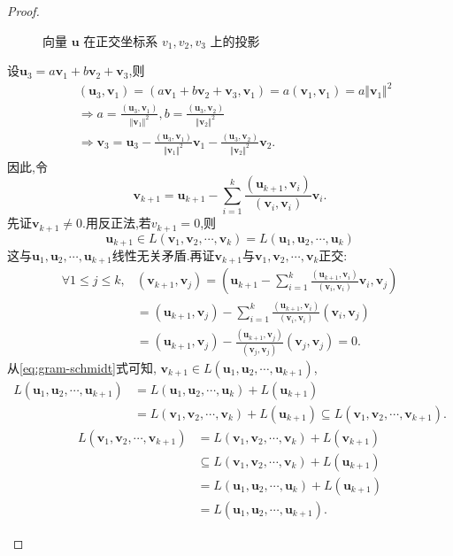 \begin{proof}
\begin{asparaenum}[(1)]
\begin{figure}[htbp]
      \caption{向量 $\mathbf{u}$ 在正交坐标系 $v_1,v_2,v_3$ 上的投影}
      \label{fig:projection}
    \end{figure}
    设$\bm{u}_3=a\bm{v}_1+b\bm{v}_2+\bm{v}_3$,则
    \begin{align*}
    & (\bm{u}_3,\bm{v}_1)=(a\bm{v}_1+b\bm{v}_2+\bm{v}_3,\bm{v}_1)=a(\bm{v}_1,\bm{v}_1)
    =a\Vert\bm{v}_1\Vert^2\\
    & \Longrightarrow a=\frac{(\bm{u}_3,\bm{v}_1)}{\Vert\bm{v}_1\Vert^2},
    b=\frac{(\bm{u}_3,\bm{v}_2)}{\Vert\bm{v}_2\Vert^2}\\
    & \Longrightarrow \bm{v}_3=\bm{u}_3-\frac{(\bm{u}_3,\bm{v}_1)}{\Vert\bm{v}_1\Vert^2}\bm{v}_1
    -\frac{(\bm{u}_3,\bm{v}_2)}{\Vert\bm{v}_2\Vert^2}\bm{v}_2.
    \end{align*}
    因此,令
    \begin{equation}\label{eq:gram-schmidt}
    \boxed{\bm{v}_{k+1} = \bm{u}_{k+1}-\sum_{i=1}^k\frac{(\bm{u}_{k+1},\bm{v}_i)}{(\bm{v}_i,\bm{v}_i)}\bm{v}_i.}
    \end{equation}
    先证$\bm{v}_{k+1}\neq 0$.用反正法,若$v_{k+1}=0$,则
    \[ \bm{u}_{k+1} \in L(\bm{v}_1,\bm{v}_2,\cdots,\bm{v}_k) = L(\bm{u}_1,\bm{u}_2,\cdots,\bm{u}_k)\]
    这与$\bm{u}_1,\bm{u}_2,\cdots,\bm{u}_{k+1}$线性无关矛盾.再证$\bm{v}_{k+1}$与$\bm{v}_1,\bm{v}_2,\cdots,\bm{v}_k$正交:
    \begin{align*}
      \forall 1 \leq j \leq k, & (\bm{v}_{k+1},\bm{v}_j) = (\bm{u}_{k+1}-\sum_{i=1}^k\frac{(\bm{u}_{k+1},\bm{v}_i)}{(\bm{v}_i,\bm{v}_i)}\bm{v}_i,\bm{v}_j)\\
      & = (\bm{u}_{k+1},\bm{v}_j)-\sum_{i=1}^k\frac{(\bm{u}_{k+1},\bm{v}_i)}{(\bm{v}_i,\bm{v}_i)}(\bm{v}_i,\bm{v}_j)\\
      & = (\bm{u}_{k+1},\bm{v}_j)-\frac{(\bm{u}_{k+1},\bm{v}_j)}{(\bm{v}_j,\bm{v}_j)}(\bm{v}_j,\bm{v}_j) = 0.
    \end{align*}
    从\eqref{eq:gram-schmidt}式可知, $\bm{v}_{k+1} \in L(\bm{u}_1,\bm{u}_2,\cdots,\bm{u}_{k+1})$,
    \begin{align*}
      L(\bm{u}_1,\bm{u}_2,\cdots,\bm{u}_{k+1}) & = 
      L(\bm{u}_1,\bm{u}_2,\cdots,\bm{u}_k)+L(\bm{u}_{k+1})\\
      & = L(\bm{v}_1,\bm{v}_2,\cdots,\bm{v}_k)+L(\bm{u}_{k+1}) 
      \subseteq L(\bm{v}_1,\bm{v}_2,\cdots,\bm{v}_{k+1}).
    \end{align*}
    \begin{align*}
     L(\bm{v}_1,\bm{v}_2,\cdots,\bm{v}_{k+1}) & =
     L(\bm{v}_1,\bm{v}_2,\cdots,\bm{v}_k)+L(\bm{v}_{k+1})\\
     & \subseteq L(\bm{v}_1,\bm{v}_2,\cdots,\bm{v}_k)+L(\bm{u}_{k+1})\\
      & = L(\bm{u}_1,\bm{u}_2,\cdots,\bm{u}_k)+L(\bm{u}_{k+1})\\
      & = L(\bm{u}_1,\bm{u}_2,\cdots,\bm{u}_{k+1}).
    \end{align*}  
\end{asparaenum}
\end{proof}

